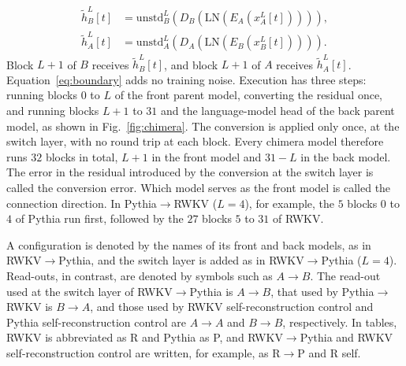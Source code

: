 \documentclass[conference]{IEEEtran}
\newcommand{\figref}[1]{Fig.~\ref{#1}}
\newcommand{\RWKVself}{RWKV self-reconstruction control}
\newcommand{\Pythiaself}{Pythia self-reconstruction control}
\newcommand{\RtoP}{RWKV$\to$\allowbreak Pythia}
\newcommand{\PtoR}{Pythia$\to$\allowbreak RWKV}
\newcommand{\RtoPL}[1]{\RtoP{} ($L{=}#1$)}
\newcommand{\PtoRL}[1]{\PtoR{} ($L{=}#1$)}
\begin{document}
\begin{equation}\label{eq:boundary}
\begin{aligned}
\widetilde h_B^L[t]
 &= \mathrm{unstd}_B^L\!\left(D_B\!\left(\mathrm{LN}(E_A(x_A^L[t]))\right)\right),\\
\widetilde h_A^L[t]
 &= \mathrm{unstd}_A^L\!\left(D_A\!\left(\mathrm{LN}(E_B(x_B^L[t]))\right)\right).
\end{aligned}
\end{equation}
Block $L{+}1$ of $B$ receives $\widetilde h_B^L[t]$, and block $L{+}1$ of $A$ receives $\widetilde h_A^L[t]$.
Equation~\eqref{eq:boundary} adds no training noise. Execution has three steps: running blocks $0$ to $L$ of the front parent model,
converting the residual once, and running blocks $L{+}1$ to $31$ and the language-model head of the back parent model, as shown in
\figref{fig:chimera}. The conversion is applied only once, at the switch layer, with no round trip at each block.
Every chimera model therefore runs $32$ blocks in total, $L{+}1$ in the front model and $31{-}L$ in the back model. The error in the
residual introduced by the conversion at the switch layer is called the conversion error.
Which model serves as the front model is called the connection direction. In \PtoRL{4}, for example, the $5$ blocks $0$ to $4$ of
Pythia run first, followed by the $27$ blocks $5$ to $31$ of RWKV.

A configuration is denoted by the names of its front and back models, as in \RtoP{}, and the switch layer is added as in \RtoPL{4}.
Read-outs, in contrast, are denoted by symbols such as $A\!\to\!B$. The read-out used at the switch layer of \RtoP{} is $A\!\to\!B$,
that used by \PtoR{} is $B\!\to\!A$, and those used by \RWKVself{} and \Pythiaself{} are $A\!\to\!A$ and $B\!\to\!B$, respectively.
In tables, RWKV is abbreviated as R and Pythia as P, and \RtoP{} and \RWKVself{} are written, for example, as R$\to$P
and R self.
\end{document}

